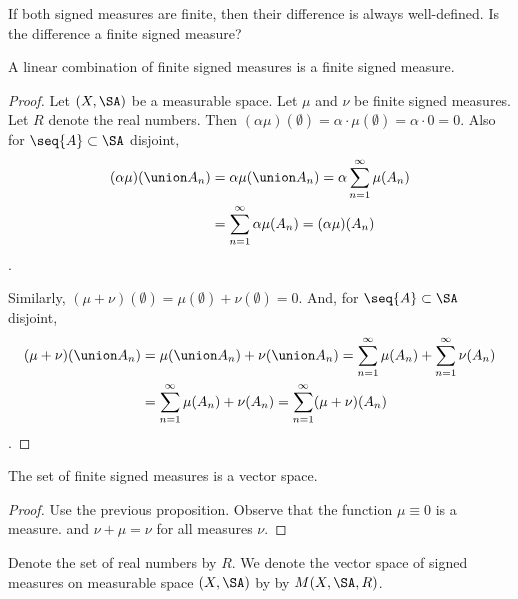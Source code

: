 

If both signed measures are finite,
then their difference is always
well-defined.
Is the difference a finite signed
measure?


\begin{prop}
A linear combination of
finite signed measures is
a finite signed measure.
\begin{proof}
Let $(X,\SA)$ be a measurable space.
Let $\mu$ and $\nu$ be finite signed measures.
Let $R$ denote the real numbers.
Then $(\alpha\mu)(\emptyset) = \alpha \cdot \mu(\emptyset) = \alpha \cdot 0 = 0$.
Also for $\seq{A} \subset \SA$ disjoint,
$$
\begin{aligned}
  (\alpha\mu)(\union A_n) &= \alpha \mu(\union A_n)
  = \alpha \sum_{n = 1}^{\infty} \mu(A_n) \\ &= \sum_{n = 1}^{\infty} \alpha \mu(A_n) = (\alpha\mu)(A_n)
\end{aligned}
$$.

Similarly,
$(\mu + \nu)(\emptyset) = \mu(\emptyset) + \nu(\emptyset) = 0$.
And,
for $\seq{A} \subset \SA$ disjoint,
$$
\begin{aligned}
  (\mu + \nu)(\union A_n) &= \mu(\union A_n) + \nu(\union A_n)
  = \sum_{n = 1}^{\infty} \mu(A_n) +
  \sum_{n = 1}^{\infty} \nu(A_n) \\
  &= \sum_{n = 1}^{\infty} \mu(A_n) + \nu(A_n)
  = \sum_{n = 1}^{\infty} (\mu + \nu)(A_n)
\end{aligned}
$$.
\end{proof}
\end{prop}


\begin{prop}
  The set of finite signed
  measures is a vector space.
  \begin{proof}
    Use the previous proposition.
    Observe that the function
    $\mu \equiv 0$ is a measure.
    and $\nu + \mu = \nu$ for
    all measures $\nu$.
  \end{proof}
\end{prop}

Denote the set of real
numbers by $R$.
We denote the vector
space of signed measures
on measurable space
$(X, \SA)$ by
by $M(X, \SA, R)$.

